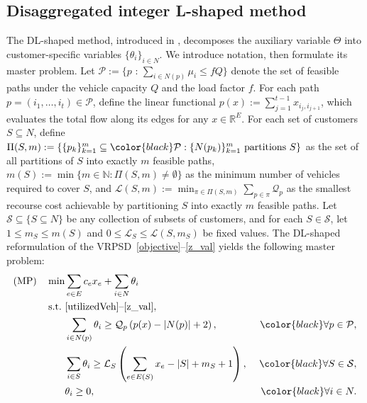 \documentclass{article}
\newcommand{\rev}[1]{{\color{black}#1}}
\begin{document}
\subsection{Disaggregated integer L-shaped method}\label{sec:analysis_DL_shaped:DL-shaped}
The DL-shaped method, introduced in \cite{parada2024disaggregated}, decomposes the auxiliary variable $\Theta$ into customer-specific variables $\{\theta_{i}\}_{i \in N}$. We introduce notation, then formulate its master problem. Let $\mathcal{P} := \{\text{$p$ : $\sum_{i \in N(p)} \mu_i \leq fQ$}\}$ denote the set of feasible paths under the vehicle capacity $Q$ and the load factor $f$. For each path $p = (i_1, \dots, i_t) \in \mathcal{P}$, define the \rev{linear functional $p(x) := \sum_{j=1}^{t-1} x_{i_j, i_{j+1}}$, which evaluates the total flow along its edges for any $x \in \mathbb{R}^E$}. For each set of customers $S \subseteq N$, define $\Pi(S,m) := \left\{ \{p_k\}_{k=1}^m \subseteq \rev{\mathcal{P}} : \{N(p_k)\}_{k=1}^m \text{ partitions $S$} \right\}$ as the set of all partitions of $S$ into exactly $m$ feasible paths, $m(S) := \min\{m \in \mathbb{N} : \Pi(S,m) \neq \emptyset\}$ as the minimum number of vehicles required to cover $S$, and $\mathcal{L}(S, m) := \min_{ \pi \in \Pi(S,m)} \sum_{p \in \pi} \mathcal{Q}_{p}$ as the smallest recourse cost achievable by partitioning $S$ into exactly $m$ feasible paths. Let $\mathcal{S} \subseteq \{S \subseteq N\}$ be any collection of subsets of customers, and for each $S \in \mathcal{S}$, let $1 \leq m_S \leq m(S)$ and $0 \leq \mathcal{L}_{S}\leq \mathcal{L}(S, m_S)$ be fixed values. \rev{The DL-shaped reformulation of the VRPSD~\eqref{objective}--\eqref{z_val} yields the following master problem:}
\begingroup
\allowdisplaybreaks
\begin{alignat}{2}
    (\text{MP}) \quad \min & \sum_{e \in E} c_{e}x_{e} + \sum_{i \in N} \theta_{i} \label{DL:obj} \\
\text{s.t.}\ & \text{\eqref{utilizedVeh}--\eqref{z_val}}, \nonumber \\
    & \sum_{i \in N(p)} \theta_{i} \geq \mathcal{Q}_p  \left( p(x)-|N(p)|+2 \right), & \rev{\forall} p \in \mathcal{P}, \label{DL:p-cut}  \\
    & \sum_{i \in S} \theta_{i} \geq \mathcal{L}_{S}\left( \sum_{e \in E(S)}x_{e} - |S| + m_S + 1 \right), &\ \rev{\forall} S \in \mathcal{S},\label{DL:s-cut} \\
    & \theta_{i} \geq 0, & \rev{\forall} i \in N. \label{DL:theta}
\end{alignat}
\endgroup
\end{document}
